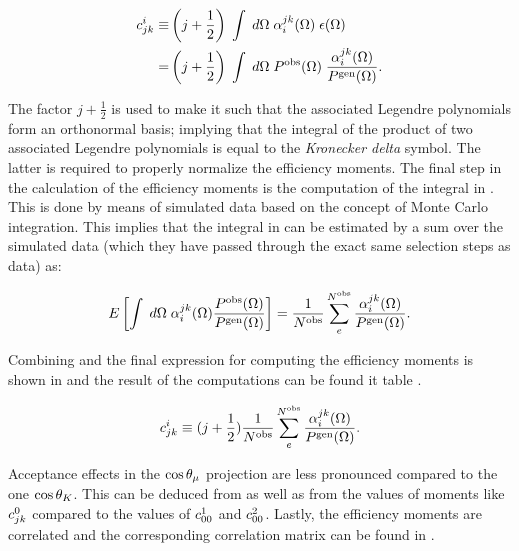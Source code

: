\begin{align}
  \centering
   c^i_{jk}  \equiv & \parenthesis{j + \frac{1}{2}} \; \int \; d\Omega \; \effbase \; \epsilon(\Omega) \nonumber \\
                 =  & \parenthesis{j + \frac{1}{2}} \; \int \; d\Omega \; \Pobs \; \frac{\effbase}{\Pgen}.
  \label{eff_moms_def}
\end{align}

\noindent The factor $j+\frac{1}{2}$ is used to make it such that the associated Legendre polynomials form an
orthonormal basis; implying that the integral of the product of two associated Legendre polynomials is equal
to the {\it Kronecker delta} symbol. The latter is required to properly normalize the efficiency moments.
The final step in the calculation of the efficiency moments is the computation of the integral in .
This is done by means of simulated data based on the concept of Monte Carlo integration.
This implies that the integral in  can be estimated by a sum over the simulated data
(which they have passed through the exact same selection steps as data) as:

\begin{equation}
\centering
  E\left[ \int \; d\Omega \; \effbase \frac{\Pobs}{\Pgen} \right] = \frac{1}{\Nobs} \sum_e^{\Nobs} \frac{\effbase}{\Pgen}.
  \label{eff_moms_calc}
\end{equation}

\noindent Combining  and  the final expression for computing the efficiency moments is shown
in  and the result of the computations can be found it table .

\begin{equation}
\centering
 c^i_{jk} \equiv (j + \frac{1}{2})  \frac{1}{\Nobs} \sum_e^{\Nobs} \frac{\effbase}{\Pgen}.
  \label{eff_moms_calc_final}
\end{equation}

Acceptance effects in the $\cos\theta_{\mu}$ projection are less pronounced compared to the one $\cos\theta_{K}$.
This can be deduced from  as well as from the values of moments like $c^{0}_{jk}$
compared to the values of $c^{1}_{00}$ and $c^{2}_{00}$. Lastly, the efficiency moments are
correlated and the corresponding correlation matrix can be found in .


